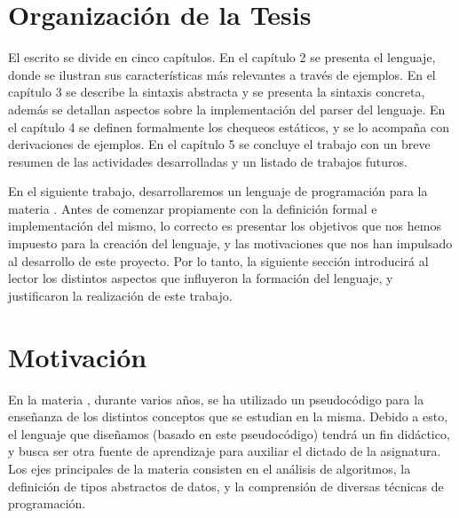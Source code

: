 \section{Organización de la Tesis}

El escrito se divide en cinco capítulos.
En el capítulo 2 se presenta el lenguaje, donde se ilustran sus características más relevantes a través de ejemplos.
En el capítulo 3 se describe la sintaxis abstracta y se presenta la sintaxis concreta, además se detallan aspectos sobre la implementación del parser del lenguaje.
En el capítulo 4 se definen formalmente los chequeos estáticos, y se lo acompaña con derivaciones de ejemplos.
En el capítulo 5 se concluye el trabajo con un breve resumen de las actividades desarrolladas y un listado de trabajos futuros.

\iffalse
En el siguiente trabajo, desarrollaremos un lenguaje de programación para la materia \Materia{}.
Antes de comenzar propiamente con la definición formal e implementación del mismo, lo correcto es presentar los objetivos que nos hemos impuesto para la creación del lenguaje, y las motivaciones que nos han impulsado al desarrollo de este proyecto.
Por lo tanto, la siguiente sección introducirá al lector los distintos aspectos que influyeron la formación del lenguaje, y justificaron la realización de este trabajo.

\section{Motivación}

En la materia \Materia{}, durante varios años, se ha utilizado un pseudocódigo para la enseñanza de los distintos conceptos que se estudian en la misma.
Debido a esto, el lenguaje que diseñamos (basado en este pseudocódigo) tendrá un fin didáctico, y busca ser otra fuente de aprendizaje para auxiliar el dictado de la asignatura.
Los ejes principales de la materia consisten en el análisis de algoritmos, la definición de tipos abstractos de datos, y la comprensión de diversas técnicas de programación.


